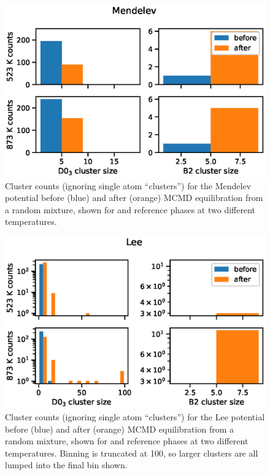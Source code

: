 %
\begin{figure}[h]
    \centering
    \includegraphics[width=\textwidth]{figures/mendelev_hist_thresh13}
    \caption{Cluster counts (ignoring single atom ``clusters'') for the Mendelev potential before (blue) and after (orange) MCMD equilibration from a random mixture, shown for \DOTHREE and \BTWO reference phases at two different temperatures.}
    \label{fig:mendelev_hist}
\end{figure}
%
\begin{figure}[h]
    \centering
    \includegraphics[width=\textwidth]{figures/lee_hist_thresh13}
    \caption{Cluster counts (ignoring single atom ``clusters'') for the Lee potential before (blue) and after (orange) MCMD equilibration from a random mixture, shown for \DOTHREE and \BTWO reference phases at two different temperatures. Binning is truncated at 100, so larger clusters are all lumped into the final bin shown.}
    \label{fig:lee_hist}
\end{figure}

